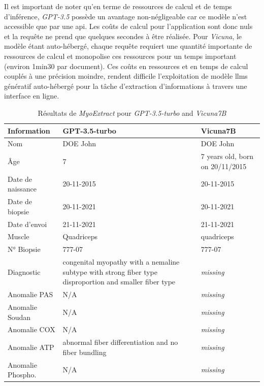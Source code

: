 Il est important de noter qu'en terme de ressources de calcul et de temps d'inférence, \textit{GPT-3.5} possède un avantage non-négligeable car ce modèle n'est accessible que par une \gls{api}. Les coûts de calcul pour l'application sont donc nuls et la requête ne prend que quelques secondes à être réalisée. Pour \textit{Vicuna}, le modèle étant auto-hébergé, chaque requête requiert une quantité importante de ressources de calcul et monopolise ces ressources pour un temps important (environ 1min30 par document). Ces coûts en ressources et en temps de calcul couplés à une précision moindre, rendent difficile l'exploitation de modèle \gls{llms} génératif auto-hébergé pour la tâche d'extraction d'informations à travers une interface en ligne.
\begin{table}[!ht]
\centering
\caption{Résultats de \textit{MyoExtract} pour \textit{GPT-3.5-turbo} and \textit{Vicuna7B}}
\label{tab:json_data}
\begin{tabularx}{\textwidth}{|l|X|X|}
\hline
\textbf{Information} & \textbf{GPT-3.5-turbo} & \textbf{Vicuna7B} \\ \hline
Nom & DOE John & DOE John \\ \hline
Âge & 7 & 7 years old, born on 20/11/2015 \\ \hline
Date de naissance & 20-11-2015 & 20-11-2015 \\ \hline
Date de biopsie & 20-11-2021 & 20-11-2021 \\ \hline
Date d'envoi & 21-11-2021 & 21-11-2021 \\ \hline
Muscle & Quadriceps & quadriceps \\ \hline
N° Biopsie & 777-07 & 777-07 \\ \hline
Diagnostic & congenital myopathy with a nemaline subtype with strong fiber type disproportion and smaller fiber type & \textit{missing} \\ \hline
Anomalie PAS & N/A & \textit{missing} \\ \hline
Anomalie Soudan & N/A & \textit{missing} \\ \hline
Anomalie COX & N/A & \textit{missing} \\ \hline
Anomalie ATP & abnormal fiber differentiation and no fiber bundling & \textit{missing} \\ \hline
Anomalie Phospho. & N/A & \textit{missing} \\ \hline
\end{tabularx}
\end{table}

